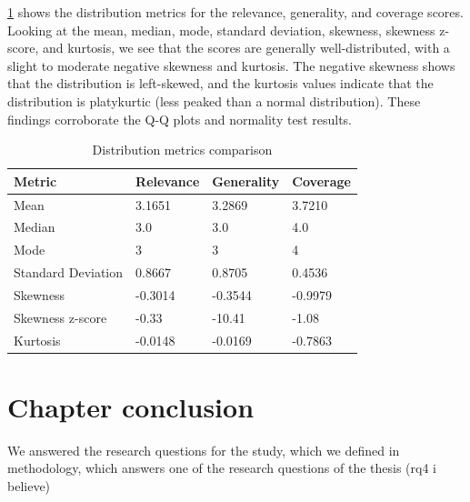 \cref{tab:distribution_comparison} shows the distribution metrics for the relevance, generality, and coverage scores. Looking at the mean, median, mode, standard deviation, skewness, skewness z-score, and kurtosis, we see that the scores are generally well-distributed, with a slight to moderate negative skewness and kurtosis. The negative skewness shows that the distribution is left-skewed, and the kurtosis values indicate that the distribution is platykurtic (less peaked than a normal distribution). These findings corroborate the Q-Q plots and normality test results.

\begin{table}[htbp]
    \centering
    \caption{Distribution metrics comparison}
    \begin{tabular}{llll}
        \hline
        \textbf{Metric} & \textbf{Relevance} & \textbf{Generality} & \textbf{Coverage} \\
        \hline
        Mean & 3.1651 & 3.2869 & 3.7210 \\
        Median & 3.0 & 3.0 & 4.0 \\
        Mode & 3 & 3 & 4 \\
        Standard Deviation & 0.8667 & 0.8705 & 0.4536 \\
        Skewness & -0.3014 & -0.3544 & -0.9979 \\
        Skewness z-score & -0.33 & -10.41 & -1.08 \\
        Kurtosis & -0.0148 & -0.0169 & -0.7863 \\
        \hline
    \end{tabular}
    \label{tab:distribution_comparison}
\end{table}


\section{Chapter conclusion}
We answered the research questions for the study, which we defined in methodology, which answers one of the research questions of the thesis (rq4 i believe)